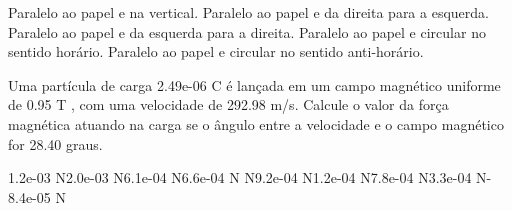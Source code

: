 \documentclass[12pt, addpoints]{exam}
\begin{document}
\begin{questions}
\begin{multicols*}{2}
\begin{choices}
\choice Paralelo ao papel e na vertical. 
\choice Paralelo ao papel e da direita para a esquerda. 
\choice Paralelo ao papel e da esquerda para a direita. 
\choice Paralelo ao papel e circular no sentido horário. 
\choice Paralelo ao papel e circular no sentido anti-horário. 
\end{choices}
\question Uma partícula de carga 2.49e-06 C é lançada em um campo magnético uniforme de    0.95 T , com uma velocidade de 292.98 m/s. Calcule o valor da força magnética atuando na carga se o ângulo entre a velocidade e o campo magnético for   28.40 graus.

\begin{oneparchoices}
\choice 1.2e-03 N\choice 2.0e-03 N\choice 6.1e-04 N\choice 6.6e-04 N N\choice 9.2e-04 N\choice 1.2e-04 N\choice 7.8e-04 N\choice 3.3e-04 N\choice -8.4e-05 N
\end{oneparchoices}\end{multicols*}
\end{questions}
\newpage
\end{document}
